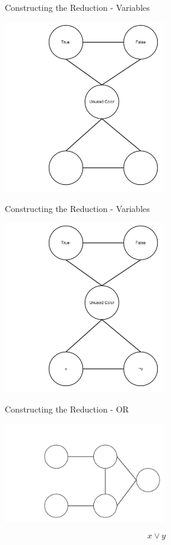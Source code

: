 \documentclass[bigger]{beamer}
\begin{document}
\begin{frame}[label=sec-8]{Constructing the Reduction - Variables}
\begin{center}
\includegraphics[width=7cm]{Variable1.png}
\end{center}
\end{frame}

\begin{frame}[label=sec-9]{Constructing the Reduction - Variables}
\begin{center}
\includegraphics[width=7cm]{Variable2.png}
\end{center}
\end{frame}

\begin{frame}[label=sec-10]{Constructing the Reduction - OR}
\begin{center}
\includegraphics[width=7cm]{Or1.png}
\end{center}

\[x\vee y\]
\end{frame}
\end{document}
